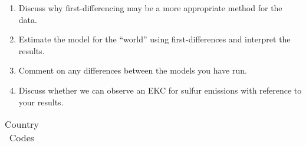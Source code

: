 \documentclass{scrartcl}
\begin{document}
\begin{enumerate}
	\item Discuss why first-differencing may be a more appropriate method for the data.
	
	\item Estimate the model for the ``world'' using first-differences and interpret the results.
	
	\item Comment on any differences between the models you have run.
	
	\item Discuss whether we can observe an EKC for sulfur emissions with reference to your results.
	
	\end{enumerate}
	
	\begin{table}[h!]\caption{Country Codes}\label{tab:imp}
	\begin{center}
	
\begin{tabular}{|l|c|l|c|}

\hline


\end{tabular}
\end{center}
\end{table}
\end{document}
